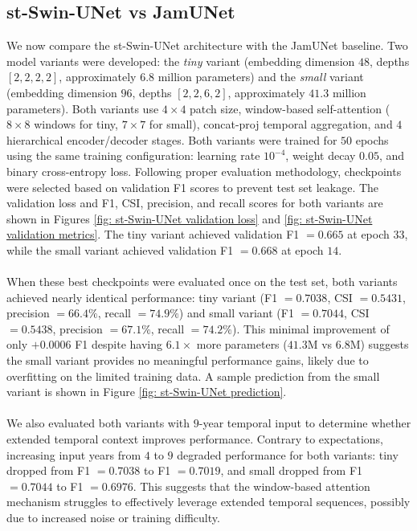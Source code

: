 \documentclass[10pt,oneside,a4paper,english]{article}
\begin{document}
\subsection{st-Swin-UNet vs JamUNet}
We now compare the st-Swin-UNet architecture with the JamUNet baseline. Two model variants were developed: the \textit{tiny} variant (embedding dimension $48$, depths $[2,2,2,2]$, approximately $6.8$ million parameters) and the \textit{small} variant (embedding dimension $96$, depths $[2,2,6,2]$, approximately $41.3$ million parameters). Both variants use $4 \times 4$ patch size, window-based self-attention ($8 \times 8$ windows for tiny, $7 \times 7$ for small), concat-proj temporal aggregation, and $4$ hierarchical encoder/decoder stages. Both variants were trained for $50$ epochs using the same training configuration: learning rate $10^{-4}$, weight decay $0.05$, and binary cross-entropy loss. Following proper evaluation methodology, checkpoints were selected based on validation F1 scores to prevent test set leakage. The validation loss and F1, CSI, precision, and recall scores for both variants are shown in Figures \ref{fig: st-Swin-UNet validation loss} and \ref{fig: st-Swin-UNet validation metrics}. The tiny variant achieved validation F1 $= 0.665$ at epoch $33$, while the small variant achieved validation F1 $= 0.668$ at epoch $14$. \\
\\
When these best checkpoints were evaluated once on the test set, both variants achieved nearly identical performance: tiny variant (F1 $= 0.7038$, CSI $= 0.5431$, precision $= 66.4\%$, recall $= 74.9\%$) and small variant (F1 $= 0.7044$, CSI $= 0.5438$, precision $= 67.1\%$, recall $= 74.2\%$). This minimal improvement of only $+0.0006$ F1 despite having $6.1\times$ more parameters ($41.3$M vs $6.8$M) suggests the small variant provides no meaningful performance gains, likely due to overfitting on the limited training data. A sample prediction from the small variant is shown in Figure \ref{fig: st-Swin-UNet prediction}. \\
\\
We also evaluated both variants with $9$-year temporal input to determine whether extended temporal context improves performance. Contrary to expectations, increasing input years from $4$ to $9$ degraded performance for both variants: tiny dropped from F1 $= 0.7038$ to F1 $= 0.7019$, and small dropped from F1 $= 0.7044$ to F1 $= 0.6976$. This suggests that the window-based attention mechanism struggles to effectively leverage extended temporal sequences, possibly due to increased noise or training difficulty. \\
\end{document}
